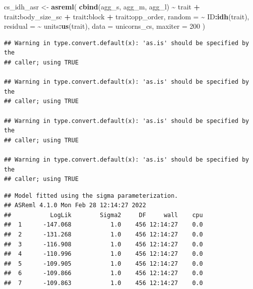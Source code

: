 \documentclass[
  12pt,
]{book}
\newenvironment{Shaded}{\begin{snugshade}}{\end{snugshade}}
\newcommand{\DataTypeTok}[1]{\textcolor[rgb]{0.13,0.29,0.53}{#1}}
\newcommand{\DecValTok}[1]{\textcolor[rgb]{0.00,0.00,0.81}{#1}}
\newcommand{\KeywordTok}[1]{\textcolor[rgb]{0.13,0.29,0.53}{\textbf{#1}}}
\newcommand{\NormalTok}[1]{#1}
\newcommand{\OperatorTok}[1]{\textcolor[rgb]{0.81,0.36,0.00}{\textbf{#1}}}
\newcommand{\OtherTok}[1]{\textcolor[rgb]{0.56,0.35,0.01}{#1}}
\newcommand{\StringTok}[1]{\textcolor[rgb]{0.31,0.60,0.02}{#1}}
\begin{document}
\begin{Shaded}
\begin{Highlighting}[]
\NormalTok{cs\_idh\_asr \textless{}{-}}\StringTok{ }\KeywordTok{asreml}\NormalTok{(}
  \KeywordTok{cbind}\NormalTok{(agg\_s, agg\_m, agg\_l) }\OperatorTok{\textasciitilde{}}\StringTok{ }\NormalTok{trait }\OperatorTok{+}\StringTok{ }\NormalTok{trait}\OperatorTok{:}\NormalTok{body\_size\_sc }\OperatorTok{+}
\StringTok{    }\NormalTok{trait}\OperatorTok{:}\NormalTok{block }\OperatorTok{+}
\StringTok{    }\NormalTok{trait}\OperatorTok{:}\NormalTok{opp\_order,}
  \DataTypeTok{random =} \OperatorTok{\textasciitilde{}}\StringTok{ }\NormalTok{ID}\OperatorTok{:}\KeywordTok{idh}\NormalTok{(trait),}
  \DataTypeTok{residual =} \OperatorTok{\textasciitilde{}}\StringTok{ }\NormalTok{units}\OperatorTok{:}\KeywordTok{us}\NormalTok{(trait),}
  \DataTypeTok{data =}\NormalTok{ unicorns\_cs,}
  \DataTypeTok{maxiter =} \DecValTok{200}
\NormalTok{)}
\end{Highlighting}
\end{Shaded}

\begin{verbatim}
## Warning in type.convert.default(x): 'as.is' should be specified by the
## caller; using TRUE

## Warning in type.convert.default(x): 'as.is' should be specified by the
## caller; using TRUE

## Warning in type.convert.default(x): 'as.is' should be specified by the
## caller; using TRUE

## Warning in type.convert.default(x): 'as.is' should be specified by the
## caller; using TRUE
\end{verbatim}

\begin{verbatim}
## Model fitted using the sigma parameterization.
## ASReml 4.1.0 Mon Feb 28 12:14:27 2022
##           LogLik        Sigma2     DF     wall    cpu
##  1      -147.068           1.0    456 12:14:27    0.0
##  2      -131.268           1.0    456 12:14:27    0.0
##  3      -116.908           1.0    456 12:14:27    0.0
##  4      -110.996           1.0    456 12:14:27    0.0
##  5      -109.905           1.0    456 12:14:27    0.0
##  6      -109.866           1.0    456 12:14:27    0.0
##  7      -109.863           1.0    456 12:14:27    0.0
\end{verbatim}

\begin{Shaded}
\end{Shaded}
\end{document}
